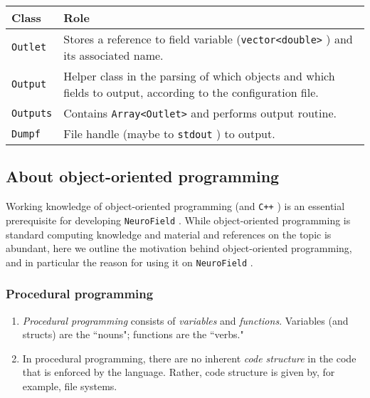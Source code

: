 \documentclass[12pt,a4paper]{article}
\newcommand{\type}[1]{{\small\small\tt #1} }
\newcommand{\NF}[0]{\type{NeuroField}}
\begin{document}
\begin{tabular}{l p{16cm}}
    Class&Role\\
    \hline
    \type{Outlet}&Stores a reference to field variable (\type{vector<double>}) and its associated name.\\
    \type{Output}&Helper class in the parsing of which objects and which fields to output, according to the configuration file.\\
    \type{Outputs}&Contains \type{Array<Outlet>} and performs output routine.\\
    \type{Dumpf}&File handle (maybe to \type{stdout}) to output.
\end{tabular}



\subsection{About object-oriented programming}

Working knowledge of object-oriented programming (and \type{C++}) is an essential prerequisite for developing \NF. While object-oriented programming is standard computing knowledge and material and references on the topic is abundant, here we outline the motivation behind object-oriented programming, and in particular the reason for using it on \NF.

\subsubsection{Procedural programming}

\begin{enumerate}

\item \emph{Procedural programming} consists of \emph{variables} and \emph{functions}. Variables (and structs) are the ``nouns"; functions are the ``verbs."

\item In procedural programming, there are no inherent \emph{code structure} in the code that is enforced by the language. Rather, code structure is given by, for example, file systems.
\end{enumerate}
\end{document}
